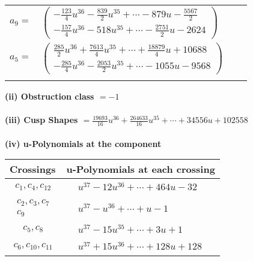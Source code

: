 \documentclass[1p]{elsarticle_modified}
\theoremstyle{definition}
\begin{document}
\begin{tabular}{m{7pt} m{180pt} m{7pt} m{180pt} }
\flushright $a_{9}=$&$\begin{pmatrix}-\frac{123}{4} u^{36}-\frac{839}{2} u^{35}+\cdots-879 u-\frac{5567}{2}\\-\frac{157}{4} u^{36}-518 u^{35}+\cdots-\frac{2751}{2} u-2624\end{pmatrix}$ \\
\flushright $a_{5}=$&$\begin{pmatrix}\frac{285}{2} u^{36}+\frac{7613}{4} u^{35}+\cdots+\frac{18879}{4} u+10688\\-\frac{285}{4} u^{36}-\frac{2053}{2} u^{35}+\cdots-1055 u-9568\end{pmatrix}$\\&\end{tabular}
\flushleft \textbf{(ii) Obstruction class $= -1$}\\~\\
\flushleft \textbf{(iii) Cusp Shapes $= \frac{19693}{16} u^{36}+\frac{264633}{16} u^{35}+\cdots+34556 u+102558$}\\~\\
\newpage\renewcommand{\arraystretch}{1}
\flushleft \textbf{(iv) u-Polynomials at the component}\newline \\
\begin{tabular}{m{50pt}|m{274pt}}
Crossings & \hspace{64pt}u-Polynomials at each crossing \\
\hline $$\begin{aligned}c_{1},c_{4},c_{12}\end{aligned}$$&$\begin{aligned}
&u^{37}-12 u^{36}+\cdots+464 u-32
\end{aligned}$\\
\hline $$\begin{aligned}c_{2},c_{3},c_{7}\\c_{9}\end{aligned}$$&$\begin{aligned}
&u^{37}- u^{36}+\cdots+u-1
\end{aligned}$\\
\hline $$\begin{aligned}c_{5},c_{8}\end{aligned}$$&$\begin{aligned}
&u^{37}-15 u^{35}+\cdots+3 u+1
\end{aligned}$\\
\hline $$\begin{aligned}c_{6},c_{10},c_{11}\end{aligned}$$&$\begin{aligned}
&u^{37}+15 u^{36}+\cdots+128 u+128
\end{aligned}$\\
\hline
\end{tabular}\\~\\
\end{document}

